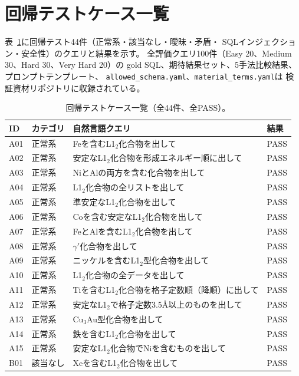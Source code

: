 \documentclass[5p,twocolumn]{elsarticle}
\begin{document}
\section{回帰テストケース一覧}
\label{sec:sup_all_tests}

表~\ref{tab:all_tests}に回帰テスト44件（正常系・該当なし・曖昧・矛盾・
SQLインジェクション・安全性）のクエリと結果を示す。
全評価クエリ100件（Easy 20、Medium 30、Hard 30、Very Hard 20）の
gold SQL、期待結果セット、5手法比較結果、
プロンプトテンプレート、
\texttt{allowed\_schema.yaml}、\texttt{material\_terms.yaml}は
検証資材リポジトリに収録されている。

\begin{table}[htbp]
\centering
\caption{回帰テストケース一覧（全44件、全PASS）。}
\label{tab:all_tests}
\footnotesize
\begin{tabular}{llp{8cm}l}
  \toprule
  ID & カテゴリ & 自然言語クエリ & 結果 \\
  \midrule
  A01 & 正常系 & Feを含むL1$_2$化合物を出して & PASS \\
  A02 & 正常系 & 安定なL1$_2$化合物を形成エネルギー順に出して & PASS \\
  A03 & 正常系 & NiとAlの両方を含む化合物を出して & PASS \\
  A04 & 正常系 & L1$_2$化合物の全リストを出して & PASS \\
  A05 & 正常系 & 準安定なL1$_2$化合物を出して & PASS \\
  A06 & 正常系 & Coを含む安定なL1$_2$化合物を出して & PASS \\
  A07 & 正常系 & FeとAlを含むL1$_2$化合物を出して & PASS \\
  A08 & 正常系 & $\gamma'$化合物を出して & PASS \\
  A09 & 正常系 & ニッケルを含むL1$_2$型化合物を出して & PASS \\
  A10 & 正常系 & L1$_2$化合物の全データを出して & PASS \\
  A11 & 正常系 & Tiを含むL1$_2$化合物を格子定数順（降順）に出して & PASS \\
  A12 & 正常系 & 安定なL1$_2$で格子定数3.5\AA 以上のものを出して & PASS \\
  A13 & 正常系 & Cu$_3$Au型化合物を出して & PASS \\
  A14 & 正常系 & 鉄を含むL1$_2$化合物を出して & PASS \\
  A15 & 正常系 & 安定なL1$_2$化合物でNiを含むものを出して & PASS \\
  \midrule
  B01 & 該当なし & Xeを含むL1$_2$化合物を出して & PASS \\

\end{tabular}
\end{table}
\end{document}
